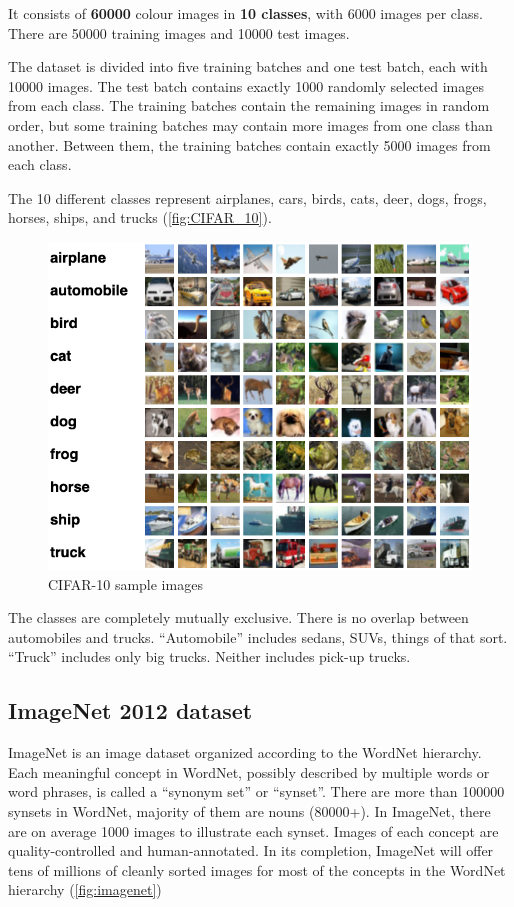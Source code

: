 It consists of \textbf{60000}  colour images in
\textbf{10 classes}, with 6000 images per class. There are 50000 training
images and 10000 test images.

The dataset is divided into five training batches and one test batch, each with
10000 images. The test batch contains exactly 1000 randomly selected images
from each class. The training batches contain the remaining images in random
order, but some training batches may contain more images from one class than
another. Between them, the training batches contain exactly 5000 images from
each class.

The 10 different classes represent airplanes, cars, birds, cats, deer, dogs,
frogs, horses, ships, and trucks (\autoref{fig:CIFAR_10}).

\begin{figure}[ht]
    \includegraphics[width=\textwidth]{images/experiments/CIFAR_10.png}
    \centering
    \caption{CIFAR-10 sample images}\label{fig:CIFAR_10}
\end{figure}

The classes are completely mutually exclusive. There is no overlap between
automobiles and trucks. ``Automobile'' includes sedans, SUVs, things of that
sort. ``Truck'' includes only big trucks. Neither includes pick-up trucks.

\subsection{ImageNet 2012 dataset}
ImageNet is an image dataset organized according to the WordNet hierarchy. Each
meaningful concept in WordNet, possibly described by multiple words or word
phrases, is called a ``synonym set'' or ``synset''. There are more than 100000
synsets in WordNet, majority of them are nouns (80000+). In ImageNet, there are
on average 1000 images to illustrate each synset.
Images of each concept are quality-controlled and human-annotated. In its
completion, ImageNet will offer tens of millions of cleanly sorted images for
most of the concepts in the WordNet hierarchy (\autoref{fig:imagenet})

